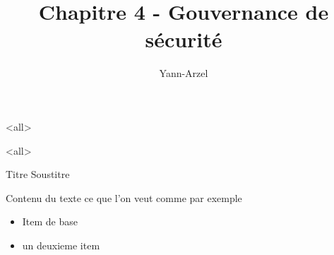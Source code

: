 
%

\title{Chapitre 4 - Gouvernance de sécurité}
\author{Yann-Arzel}








\mode<all>{}




\mode<all>{\texframe
{Titre} %
{Soustitre} %
{
	Contenu du texte ce que l'on veut comme par exemple
 \begin{itemize}
    \item Item de base
    \item un deuxieme item
 \end{itemize}
}}
